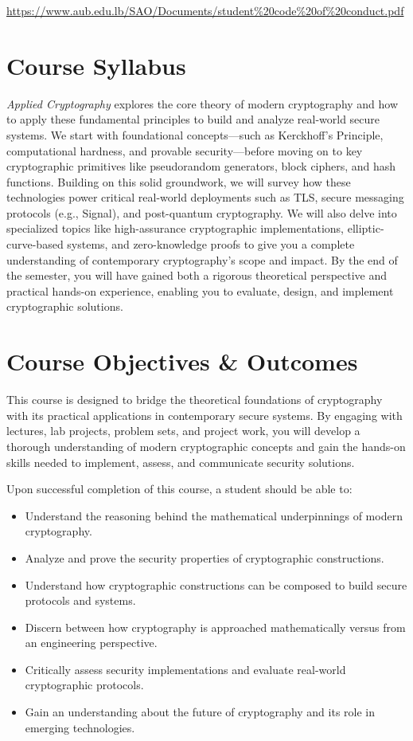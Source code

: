 \documentclass[10pt,a4paper,american]{article}
\begin{document}
\classhandoutheader

\urldef{\urlcodeofconduct}\url{https://www.aub.edu.lb/SAO/Documents/student%20code%20of%20conduct.pdf}

\section*{Course Syllabus}
\textit{Applied Cryptography} explores the core theory of modern cryptography and how to apply these fundamental principles to build and analyze real-world secure systems. We start with foundational concepts—such as Kerckhoff's Principle, computational hardness, and provable security—before moving on to key cryptographic primitives like pseudorandom generators, block ciphers, and hash functions. Building on this solid groundwork, we will survey how these technologies power critical real-world deployments such as TLS, secure messaging protocols (e.g., Signal), and post-quantum cryptography. We will also delve into specialized topics like high-assurance cryptographic implementations, elliptic-curve-based systems, and zero-knowledge proofs to give you a complete understanding of contemporary cryptography's scope and impact. By the end of the semester, you will have gained both a rigorous theoretical perspective and practical hands-on experience, enabling you to evaluate, design, and implement cryptographic solutions.

\section{Course Objectives \& Outcomes}
This course is designed to bridge the theoretical foundations of cryptography with its practical applications in contemporary secure systems. By engaging with lectures, lab projects, problem sets, and project work, you will develop a thorough understanding of modern cryptographic concepts and gain the hands-on skills needed to implement, assess, and communicate security solutions.

Upon successful completion of this course, a student should be able to:

\begin{itemize}
	\item Understand the reasoning behind the mathematical underpinnings of modern cryptography.
	\item Analyze and prove the security properties of cryptographic constructions.
	\item Understand how cryptographic constructions can be composed to build secure protocols and systems.
	\item Discern between how cryptography is approached mathematically versus from an engineering perspective.
	\item Critically assess security implementations and evaluate real-world cryptographic protocols.
	\item Gain an understanding about the future of cryptography and its role in emerging technologies.
\end{itemize}
\end{document}

